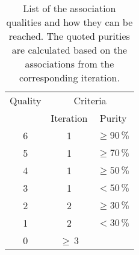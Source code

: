 
\begin{table}[h]
\begin{center}
\caption{List of the association qualities and how they can be reached. The quoted purities are calculated based on the associations from the corresponding iteration.}
\label{tab:AMWFQD}
\begin{tabular}{c c c}
Quality & \multicolumn{2}{c}{Criteria} \\
 & Iteration & Purity \\
\midrule[2pt]
6 & 1 & $\geq 90\,\%$ \\
5 & 1 & $\geq 70\,\%$ \\
4 & 1 & $\geq 50\,\%$ \\
3 & 1 & $< 50\,\%$ \\
\midrule
2 & 2 & $\geq 30\,\%$ \\
1 & 2 & $< 30\,\%$ \\
\midrule
0 & $\geq$\,3 & \\
\end{tabular}
\end{center}
\end{table}